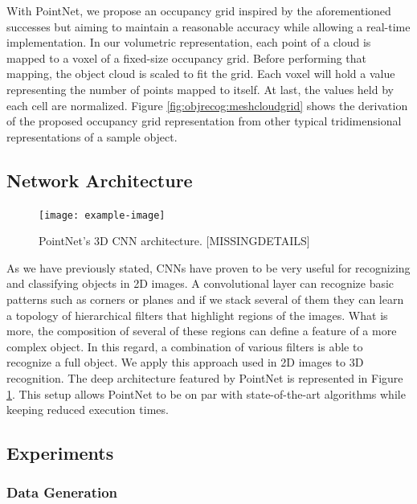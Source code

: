 With PointNet, we propose an occupancy grid inspired by the aforementioned successes but aiming to maintain a reasonable accuracy while allowing a real-time implementation. In our volumetric representation, each point of a cloud is mapped to a voxel of a fixed-size occupancy grid. Before performing that mapping, the object cloud is scaled to fit the grid. Each voxel will hold a value representing the number of points mapped to itself. At last, the values held by each cell are normalized. Figure \ref{fig:objrecog:meshcloudgrid} shows the derivation of the proposed occupancy grid representation from other typical tridimensional representations of a sample object.

\subsection{Network Architecture}
\label{cha:objrecog:sec:pointnet:subsec:network}

\begin{figure}[!t]
  \centering
  \texttt{[image: example-image]}
  \caption{PointNet's 3D \ac{CNN} architecture. [MISSINGDETAILS]}
  \label{fig:objrecog:pointnetarch}
\end{figure}

As we have previously stated, \acp{CNN} have proven to be very useful for recognizing and classifying objects in 2D images. A convolutional layer can recognize basic patterns such as corners or planes and if we stack several of them they can learn a topology of hierarchical filters that highlight regions of the images. What is more, the composition of several of these regions can define a feature of a more complex object. In this regard, a combination of various filters is able to recognize a full object. We apply this approach used in 2D images to 3D recognition. The deep architecture featured by PointNet is represented in Figure \ref{fig:objrecog:pointnetarch}. This setup allows PointNet to be on par with state-of-the-art algorithms while keeping reduced execution times.

\subsection{Experiments}
\label{cha:objrecog:sec:pointnet:subsec:experiments}


\subsubsection{Data Generation}

